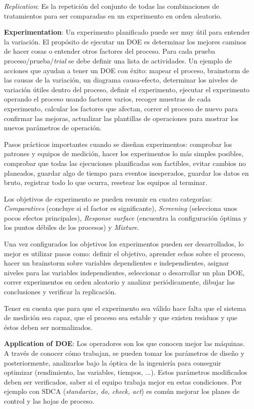 \documentclass[]{article}
\begin{document}
\textit{Replication}: Es la repetición del conjunto de todas las combinaciones de tratamientos para ser comparadas en un experimento en orden aleatorio.

\textbf{Experimentation}: Un experimento planificado puede ser muy útil para entender la variación. El propósito de ejecutar un DOE es determinar los mejores caminos de hacer cosas o entender otros factores del proceso. Para cada prueba proceso/prueba/\textit{trial} se debe definir una lista de actividades. Un ejemplo de acciones que ayudan a tener un DOE con éxito: mapear el proceso, brainstorm de las causas de la variación, un diagrama causa-efecto, determinar los niveles de variación útiles dentro del proceso, definir el experimento, ejecutar el experimento operando el proceso usando factores varios, recoger muestras de cada experimento, calcular los factores que afectan, correr el proceso de nuevo para confirmar las mejoras, actualizar las plantillas de operaciones para mostrar los nuevos parámetros de operación.

Pasos prácticos importantes cuando se diseñan experimentos: comprobar los patrones y equipos de medición, hacer los experimentos lo más simples posibles, comprobar que todas las ejecuciones planificadas son factibles, evitar cambios no planeados, guardar algo de tiempo para eventos inesperados, guardar los datos en bruto, registrar todo lo que ocurra, resetear los equipos al terminar.

Los objetivos de experimento se pueden resumir en cuatro categorías: \textit{Comparatives} (concluye si el factor es significante), \textit{Screening} (selecciona unos pocos efectos principales), \textit{Response surface} (encuentra la configuración óptima y los puntos débiles de los procesos) y \textit{Mixture}.

Una vez configurados los objetivos los experimentos pueden ser desarrollados, lo mejor es utilizar pasos como: definir el objetivo, aprender echos sobre el proceso, hacer un brainstorm sobre variables dependientes e independientes, asignar niveles para las variables independientes, seleccionar o desarrollar un plan DOE, correr experimentos en orden aleatorio y analizar periódicamente, dibujar las conclusiones y verificar la replicación.

Tener en cuenta que para que el experimento sea válido hace falta que el sistema de medición sea capaz, que el proceso sea estable y que existen residuos y que éstos deben ser normalizados.

\textbf{Application of DOE}: Los operadores son los que conocen mejor las máquinas. A través de conocer cómo trabajan, se pueden tomar los parámetros de diseño y posteriormente, analizarlos bajo la óptica de la ingeniería para conseguir optimizar (rendimiento, las variables, tiempos, ...). Estos parámetros modificados deben ser verificados, saber si el equipo trabaja mejor en estas condiciones. Por ejemplo con SDCA (\textit{standarize, do, check, act}) es común mejorar los planes de control y las hojas de proceso.
\end{document}
